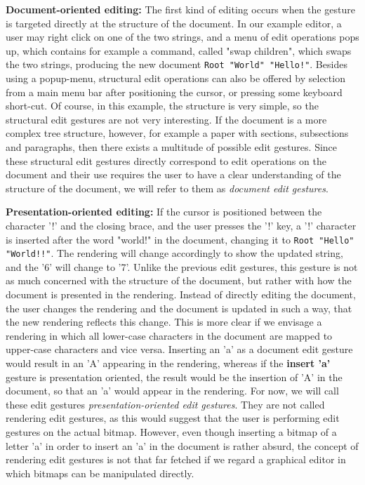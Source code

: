 {\bf Document-oriented editing:} The first kind of editing occurs when the gesture is targeted directly at the structure of the document. In our example editor, a user may right click on one of the two strings, and a menu of edit operations pops up, which contains for example a command, called "swap children", which swaps the two strings, producing the new document \texttt{Root "World" "Hello!"}. Besides using a popup-menu, structural edit operations can also be offered by selection from a main menu bar after positioning the cursor, or pressing some keyboard short-cut. Of course, in this example, the structure is very simple, so the structural edit gestures are not very interesting. If the document is a more complex tree structure, however, for example a paper with sections, subsections and paragraphs, then there exists a multitude of possible edit gestures. Since these structural edit gestures directly correspond to edit operations on the document and their use requires the user to have a clear understanding of the structure of the document, we will refer to them as {\em document edit gestures}. 

{\bf Presentation-oriented editing: }If the cursor is positioned between the character '!' and the closing brace, and the user presses the '!' key, a '!' character is inserted after the word "world!" in the document, changing it to \texttt{Root "Hello" "World!!"}. The rendering will change accordingly to show the updated string, and the '6' will change to '7'. Unlike the previous edit gestures, this gesture is not as much concerned with the structure of the document, but rather with how the document is presented in the rendering. Instead of directly editing the document, the user changes the rendering and the document is updated in such a way, that the new rendering reflects this change. This is more clear if we envisage a rendering in which all lower-case characters in the document are mapped to upper-case characters and vice versa. Inserting an 'a' as a document edit gesture would result in an 'A' appearing in the rendering, whereas if the {\bf insert 'a'} gesture is presentation oriented, the result would be the insertion of 'A' in the document, so that an 'a' would appear in the rendering. For now, we will call these edit gestures {\em presentation-oriented edit gestures}. They are not called rendering edit gestures, as this would suggest that the user is performing edit gestures on the actual bitmap. However, even though inserting a bitmap of a letter 'a' in order to insert an 'a' in the document is rather absurd, the concept of rendering edit gestures is not that far fetched if we regard a graphical editor in which bitmaps can be manipulated directly. 

